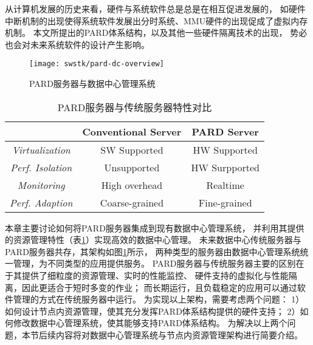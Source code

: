 
从计算机发展的历史来看，硬件与系统软件总是总是在相互促进发展的，
如硬件中断机制的出现使得系统软件发展出分时系统、MMU硬件的出现促成了虚拟内存机制。
本文所提出的PARD体系结构，以及其他一些硬件隔离技术的出现\cite{intel-rdt}，
势必也会对未来系统软件的设计产生影响。

\begin{figure}[tb]
  \centering
  \texttt{[image: swstk/pard-dc-overview]}
  \caption{PARD服务器与数据中心管理系统}
  \label{fig:pard-dc-overview}
\end{figure}

\begin{table}[tb]
\begin{center}
\begin{tabular}{c|c|c}
  \toprule[1.5pt]
  & \textbf{Conventional Server} & \textbf{PARD Server}\\
  \midrule[1pt]
  \emph{Virtualization} & SW Supported & HW Supported\\
  \hline
  \emph{Perf. Isolation} & Unsupported & HW Surpported\\
  \hline
  \emph{Monitoring} & High overhead & Realtime\\
  \hline
  \emph{Perf. Adaption} & Coarse-grained  & Fine-grained\\
  \hline
  \bottomrule[1.5pt]
\end{tabular}
\caption{PARD服务器与传统服务器特性对比}
\label{tab:pard-features}
\end{center}
\end{table}

本章主要讨论如何将PARD服务器集成到现有数据中心管理系统，
并利用其提供的资源管理特性（表\ref{tab:pard-features}）实现高效的数据中心管理。
未来数据中心传统服务器与PARD服务器共存，其架构如图\ref{fig:pard-dc-overview}所示，
两种类型的服务器由数据中心管理系统统一管理，为不同类型的应用提供服务。
PARD服务器与传统服务器主要的区别在于其提供了细粒度的资源管理、实时的性能监控、
硬件支持的虚拟化与性能隔离，因此更适合于短时多变的作业；
而长期运行，且负载稳定的应用可以通过软件管理的方式在传统服务器中运行。
为实现以上架构，需要考虑两个问题：
1）如何设计节点内资源管理，使其充分发挥PARD体系结构提供的硬件支持；
2）如何修改数据中心管理系统，使其能够支持PARD体系结构。
为解决以上两个问题，本节后续内容将对数据中心管理系统与节点内资源管理架构进行简要介绍。

